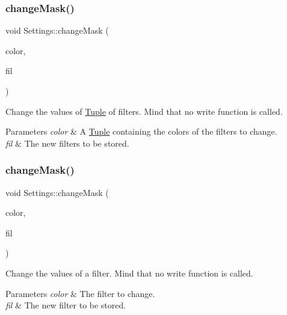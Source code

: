\subsubsection{\texorpdfstring{changeMask()}{changeMask()}\hspace{0.1cm}{\footnotesize\ttfamily [1/2]}}
{\footnotesize\ttfamily void Settings\+::change\+Mask (\begin{DoxyParamCaption}\item[{\mbox{\hyperlink{class_tuple}{Tuple}}$<$ \mbox{\hyperlink{class_settings_a30d85f2e06a54ae9bc8da2d01037658f}{C\+O\+L\+OR}} $>$}]{color,  }\item[{\mbox{\hyperlink{class_tuple}{Tuple}}$<$ \mbox{\hyperlink{class_filter}{Filter}} $>$}]{fil }\end{DoxyParamCaption})}



Change the values of \mbox{\hyperlink{class_tuple}{Tuple}} of filters. Mind that no write function is called. 


\begin{DoxyParams}{Parameters}
{\em color} & A \mbox{\hyperlink{class_tuple}{Tuple}} containing the colors of the filters to change. \\
\hline
{\em fil} & The new filters to be stored. \\
\hline
\end{DoxyParams}
\mbox{\label{class_settings_ad00eb6c82b7e6af5afbb8d881c50dea8}} 
\subsubsection{\texorpdfstring{changeMask()}{changeMask()}\hspace{0.1cm}{\footnotesize\ttfamily [2/2]}}
{\footnotesize\ttfamily void Settings\+::change\+Mask (\begin{DoxyParamCaption}\item[{\mbox{\hyperlink{class_settings_a30d85f2e06a54ae9bc8da2d01037658f}{C\+O\+L\+OR}}}]{color,  }\item[{\mbox{\hyperlink{class_filter}{Filter}}}]{fil }\end{DoxyParamCaption})}



Change the values of a filter. Mind that no write function is called. 


\begin{DoxyParams}{Parameters}
{\em color} & The filter to change. \\
\hline
{\em fil} & The new filter to be stored. \\
\hline
\end{DoxyParams}
\mbox{\label{class_settings_a8ad60105ab9848720d05ebd19c5063f2}} 
